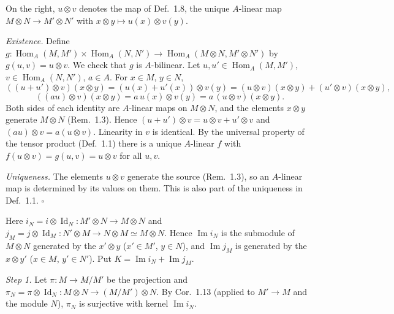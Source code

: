 \documentclass[11pt]{article}
\begin{document}
\pf
On the right, $u\otimes v$ denotes the map of Def.~1.8, the unique $A$-linear map $M\otimes N\to M'\otimes N'$ with $x\otimes y\mapsto u(x)\otimes v(y)$.

\emph{Existence.} Define $g:\operatorname{Hom}_A(M,M')\times\operatorname{Hom}_A(N,N')\to\operatorname{Hom}_A(M\otimes N,M'\otimes N')$ by $g(u,v)=u\otimes v$. We check that $g$ is $A$-bilinear. Let $u,u'\in\operatorname{Hom}_A(M,M')$, $v\in\operatorname{Hom}_A(N,N')$, $a\in A$. For $x\in M$, $y\in N$,
\[ ((u+u')\otimes v)(x\otimes y)=(u(x)+u'(x))\otimes v(y)=(u\otimes v)(x\otimes y)+(u'\otimes v)(x\otimes y), \]
\[ ((au)\otimes v)(x\otimes y)=a\,u(x)\otimes v(y)=a\,(u\otimes v)(x\otimes y). \]
Both sides of each identity are $A$-linear maps on $M\otimes N$, and the elements $x\otimes y$ generate $M\otimes N$ (Rem.~1.3). Hence $(u+u')\otimes v=u\otimes v+u'\otimes v$ and $(au)\otimes v=a(u\otimes v)$. Linearity in $v$ is identical. By the universal property of the tensor product (Def.~1.1) there is a unique $A$-linear $f$ with $f(u\otimes v)=g(u,v)=u\otimes v$ for all $u,v$.

\emph{Uniqueness.} The elements $u\otimes v$ generate the source (Rem.~1.3), so an $A$-linear map is determined by its values on them. This is also part of the uniqueness in Def.~1.1. \hfill$\square$

\pf
Here $i_N=i\otimes\operatorname{Id}_N:M'\otimes N\to M\otimes N$ and $j_M=j\otimes\operatorname{Id}_M:N'\otimes M\to N\otimes M\simeq M\otimes N$. Hence $\operatorname{Im}i_N$ is the submodule of $M\otimes N$ generated by the $x'\otimes y$ ($x'\in M'$, $y\in N$), and $\operatorname{Im}j_M$ is generated by the $x\otimes y'$ ($x\in M$, $y'\in N'$). Put $K=\operatorname{Im}i_N+\operatorname{Im}j_M$.

\emph{Step 1.} Let $\pi:M\to M/M'$ be the projection and $\pi_N=\pi\otimes\operatorname{Id}_N:M\otimes N\to(M/M')\otimes N$. By Cor.~1.13 (applied to $M'\to M$ and the module $N$), $\pi_N$ is surjective with kernel $\operatorname{Im}i_N$.
\end{document}
